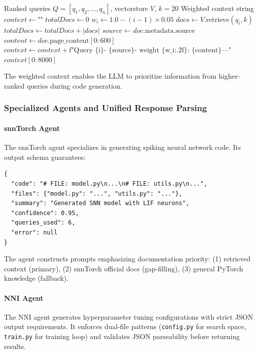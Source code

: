 \begin{algorithm}
\caption{Multi-Pass Weighted Retrieval}
\label{alg:multipass-retrieval}
\begin{algorithmic}[1]
\REQUIRE Ranked queries \(Q = [q_1, q_2, \ldots, q_n]\), vectorstore \(V\), \(k=20\)
\ENSURE Weighted context string
\STATE \(context \gets \text{""}\)
\STATE \(totalDocs \gets 0\)
    \STATE \(w_i \gets 1.0 - (i-1) \times 0.05\)
    \STATE \(docs \gets V.\text{retrieve}(q_i, k)\)
    \STATE \(totalDocs \gets totalDocs + |docs|\)
        \STATE \(source \gets doc.\text{metadata.source}\)
        \STATE \(content \gets doc.\text{page\_content}[0:600]\)
        \STATE \(context \gets context + \text{f"Query \{i\} - \{source\} - weight \{w\_i:.2f\}: \{content\}---"}\)
    \ENDFOR
\ENDFOR
\RETURN \(context[0:8000]\) 
\end{algorithmic}
\end{algorithm}

The weighted context enables the LLM to prioritize information from higher-ranked queries during code generation.

\subsubsection{Specialized Agents and Unified Response Parsing}

\paragraph{snnTorch Agent}
The snnTorch agent specializes in generating spiking neural network code. Its output schema guarantees:

\begin{verbatim}
{
  "code": "# FILE: model.py\n...\n# FILE: utils.py\n...",
  "files": {"model.py": "...", "utils.py": "..."},
  "summary": "Generated SNN model with LIF neurons",
  "confidence": 0.95,
  "queries_used": 6,
  "error": null
}
\end{verbatim}

The agent constructs prompts emphasizing documentation priority: (1) retrieved context (primary), (2) snnTorch official docs (gap-filling), (3) general PyTorch knowledge (fallback).

\paragraph{NNI Agent}
The NNI agent generates hyperparameter tuning configurations with strict JSON output requirements. It enforces dual-file patterns (\texttt{config.py} for search space, \texttt{train.py} for training loop) and validates JSON parseability before returning results.

